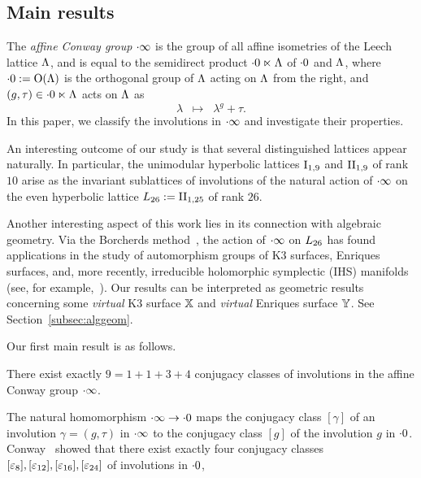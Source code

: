 \documentclass{amsart} %
\begin{document}
\subsection{Main results}
%
The \emph{affine Conway group} $\cdot \infty$ is the group of 
all affine isometries of the Leech lattice $\Lambda$,
and is equal to the semidirect product $\cdot 0 \ltimes \Lambda$
of $\cdot 0$ and $\Lambda$,
where $\cdot 0:=\mathord{\mathrm{O}}(\Lambda)$ is the orthogonal group of $\Lambda$
acting on $\Lambda$ from the right, and 
$(g, \tau)\in \cdot 0 \ltimes \Lambda$ acts on $\Lambda$ as
\[
\lambda\;\;\mapsto\;\; \lambda^g+\tau.
\]
In this paper,
we classify the involutions in $\cdot \infty$ and investigate their properties. 
\par
An interesting outcome of our study is that 
several distinguished lattices appear naturally. 
In particular, the unimodular hyperbolic lattices $\mathrm{I}_{1, 9}$ and $\mathrm{II}_{1, 9}$ of rank $10$
arise as the invariant sublattices of involutions of the natural action of $\cdot \infty$ on 
the even hyperbolic lattice $L_{26}:=\mathrm{II}_{1, 25}$ of rank $26$.                                                                                                                                                                                                                                                                                                    
\par
Another interesting aspect of this work lies in its connection with algebraic geometry. 
Via the Borcherds method~\cite{MR913200, MR1654763},
the action of $\cdot \infty$ on $L_{26}$
has found applications in the study of automorphism groups of K3 surfaces, 
Enriques surfaces, and, more recently, irreducible holomorphic symplectic (IHS) manifolds
 (see, for example,~\cite{MR4931809}).
 Our results can be interpreted as geometric results 
concerning some \emph{virtual} K3 surface $\mathord{\mathbb{X}}$ and \emph{virtual} Enriques surface $\mathord{\mathbb{Y}}$.
 See Section~\ref{subsec:alggeom}.
\par
Our first main result is as follows.
%
\begin{theorem}\label{thm:main1}
There exist exactly 
$9=1+1+3+4$
conjugacy classes of involutions in the affine Conway group $\cdot \infty$.
\end{theorem}
%
The natural homomorphism $\cdot \infty \to \cdot 0$ maps
the conjugacy class $[\gamma]$ of an involution $\gamma=(g, \tau)$
in $\cdot \infty$ to the conjugacy class $[g]$ of the involution $g$ in $\cdot 0$. 
Conway~\cite[Chapter 10,~Section 3.7]{theCSbook}
showed that there exist exactly four conjugacy classes
$[\varepsilon_8], [\varepsilon_{12}], [\varepsilon_{16}], [\varepsilon_{24}]$ of involutions in $\cdot 0$,
\end{document}
